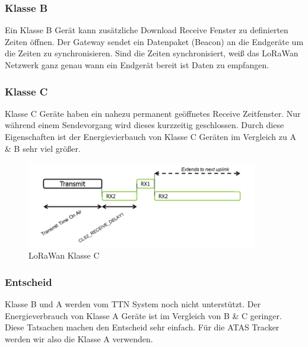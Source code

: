 \documentclass[11pt,english,german]{report}
\theoremstyle{definition}
\begin{document}
\subsubsection{Klasse B}
Ein Klasse B Gerät kann zusätzliche Download Receive Fenster zu definierten Zeiten öffnen. Der Gateway sendet ein Datenpaket (Beacon) an die Endgeräte um die Zeiten zu synchronisieren. Sind die Zeiten synchronisiert, weiß das LoRaWan Netzwerk ganz genau wann ein Endgerät bereit ist Daten zu empfangen. 

\newpage
\subsubsection{Klasse C}
Klasse C Geräte haben ein nahezu permanent geöffnetes Receive Zeitfenster. Nur während einem Sendevorgang wird dieses kurzzeitig geschlossen. Durch diese Eigenschaften ist der Energievierbauch von Klasse C Geräten im Vergleich zu A \& B sehr viel größer.

\begin{figure}[H]
	\centering
	\includegraphics[width=0.9\textwidth]{img/lorawan_class_c.png}
	\caption[LoRaWan Klasse C]
	{LoRaWan Klasse C}
\end{figure}

\subsubsection{Entscheid}
Klasse B und A werden vom TTN System noch nicht unterstützt. Der Energieverbrauch von Klasse A Geräte ist im Vergleich von B \& C geringer. Diese Tatsachen machen den Entscheid sehr einfach. Für die ATAS Tracker werden wir also die Klasse A verwenden. 

\newpage
\end{document}
